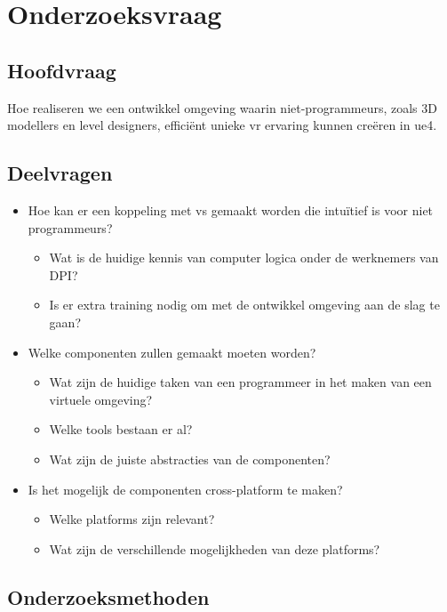 \section{Onderzoeksvraag}

\subsection{Hoofdvraag}

Hoe realiseren we een ontwikkel omgeving waarin niet-programmeurs, zoals 3D modellers en level designers, efficiënt unieke \gls{vr} ervaring kunnen creëren in \gls{ue4}.

\subsection{Deelvragen}

\begin{itemize}  
\item Hoe kan er een koppeling met \gls{vs} gemaakt worden die intuïtief is voor niet programmeurs? 
	\begin{itemize}
	\item Wat is de huidige kennis van computer logica onder de werknemers van DPI?
	\item Is er extra training nodig om met de ontwikkel omgeving aan de slag te gaan?
	\end{itemize}
\item Welke componenten zullen gemaakt moeten worden?
	\begin{itemize}
	\item Wat zijn de huidige taken van een programmeer in het maken van een virtuele omgeving?
	\item Welke tools bestaan er al?
	\item Wat zijn de juiste abstracties van de componenten? 
	\end{itemize}
\item Is het mogelijk de componenten cross-platform te maken?
	\begin{itemize}
	\item Welke platforms zijn relevant?
	\item Wat zijn de verschillende mogelijkheden van deze platforms?
	\end{itemize}
\end{itemize}

\subsection{Onderzoeksmethoden}
\label{subsec:onderzoeksmethoden}

